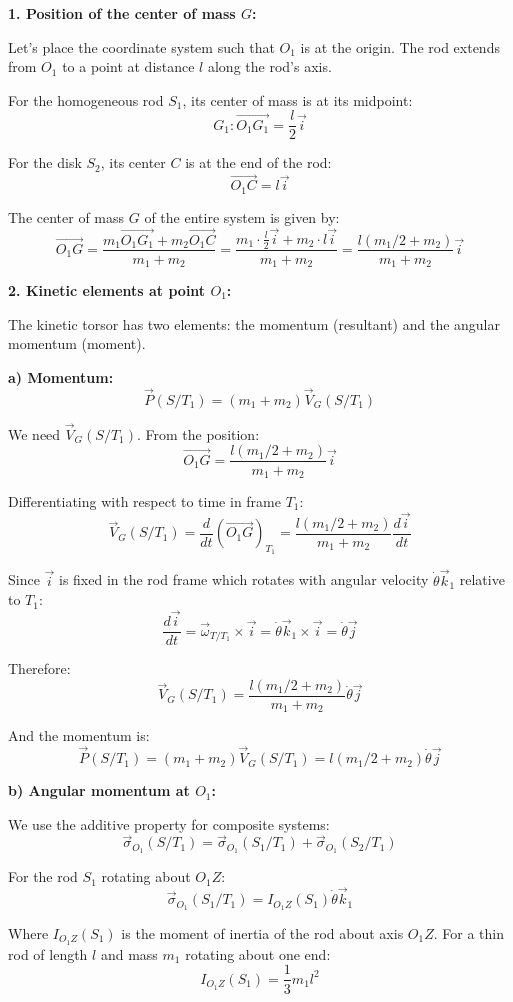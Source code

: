 \documentclass[12pt]{article}
\begin{document}
\begin{correctionbox}
\textbf{1. Position of the center of mass $G$:}

Let's place the coordinate system such that $O_1$ is at the origin. The rod extends from $O_1$ to a point at distance $l$ along the rod's axis.

For the homogeneous rod $S_1$, its center of mass is at its midpoint:
$$G_1: \vec{O_1G_1} = \frac{l}{2}\vec{i}$$

For the disk $S_2$, its center $C$ is at the end of the rod:
$$\vec{O_1C} = l\vec{i}$$

The center of mass $G$ of the entire system is given by:
$$\vec{O_1G} = \frac{m_1\vec{O_1G_1} + m_2\vec{O_1C}}{m_1 + m_2} = \frac{m_1 \cdot \frac{l}{2}\vec{i} + m_2 \cdot l\vec{i}}{m_1 + m_2} = \frac{l(m_1/2 + m_2)}{m_1 + m_2}\vec{i}$$

\textbf{2. Kinetic elements at point $O_1$:}

The kinetic torsor has two elements: the momentum (resultant) and the angular momentum (moment).

\textbf{a) Momentum:}
$$\vec{P}(S/T_1) = (m_1 + m_2)\vec{V}_G(S/T_1)$$

We need $\vec{V}_G(S/T_1)$. From the position:
$$\vec{O_1G} = \frac{l(m_1/2 + m_2)}{m_1 + m_2}\vec{i}$$

Differentiating with respect to time in frame $T_1$:
$$\vec{V}_G(S/T_1) = \frac{d}{dt}(\vec{O_1G})_{T_1} = \frac{l(m_1/2 + m_2)}{m_1 + m_2} \frac{d\vec{i}}{dt}$$

Since $\vec{i}$ is fixed in the rod frame which rotates with angular velocity $\dot{\theta}\vec{k}_1$ relative to $T_1$:
$$\frac{d\vec{i}}{dt} = \vec{\omega}_{T/T_1} \times \vec{i} = \dot{\theta}\vec{k}_1 \times \vec{i} = \dot{\theta}\vec{j}$$

Therefore:
$$\vec{V}_G(S/T_1) = \frac{l(m_1/2 + m_2)}{m_1 + m_2} \dot{\theta}\vec{j}$$

And the momentum is:
$$\vec{P}(S/T_1) = (m_1 + m_2)\vec{V}_G(S/T_1) = l(m_1/2 + m_2)\dot{\theta}\vec{j}$$

\textbf{b) Angular momentum at $O_1$:}

We use the additive property for composite systems:
$$\vec{\sigma}_{O_1}(S/T_1) = \vec{\sigma}_{O_1}(S_1/T_1) + \vec{\sigma}_{O_1}(S_2/T_1)$$

For the rod $S_1$ rotating about $O_1Z$:
$$\vec{\sigma}_{O_1}(S_1/T_1) = I_{O_1Z}(S_1)\dot{\theta}\vec{k}_1$$

Where $I_{O_1Z}(S_1)$ is the moment of inertia of the rod about axis $O_1Z$. For a thin rod of length $l$ and mass $m_1$ rotating about one end:
$$I_{O_1Z}(S_1) = \frac{1}{3}m_1l^2$$


\end{correctionbox}
\end{document}
